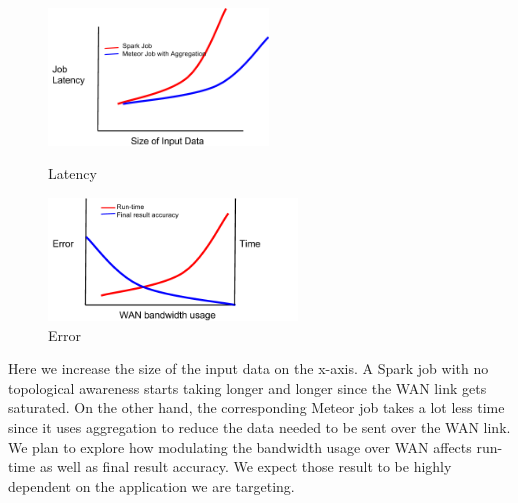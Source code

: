 \begin{figure}[ht]
	\centering
	\begin{minipage}[b]{0.45\linewidth}
		\includegraphics[width=2.3in]{figs/fig_1.png}
		\caption{Latency}
		\label{fig:minipage1}
	\end{minipage}
	\quad
	\begin{minipage}[b]{0.45\linewidth}
		\includegraphics[width=2.6in]{figs/fig_2.png}
		\caption{Error}
		\label{fig:minipage2}
	\end{minipage}
\end{figure}

Here we increase the size of the input data on the x-axis. A Spark job with no topological awareness starts taking longer and longer since the WAN link gets saturated. On the other hand, the corresponding Meteor job takes a lot less time since it uses aggregation to reduce the data needed to be sent over the WAN link. We plan to explore how modulating the bandwidth usage over WAN affects run-time as well as final result accuracy. We expect those result to be highly dependent on the application we are targeting.